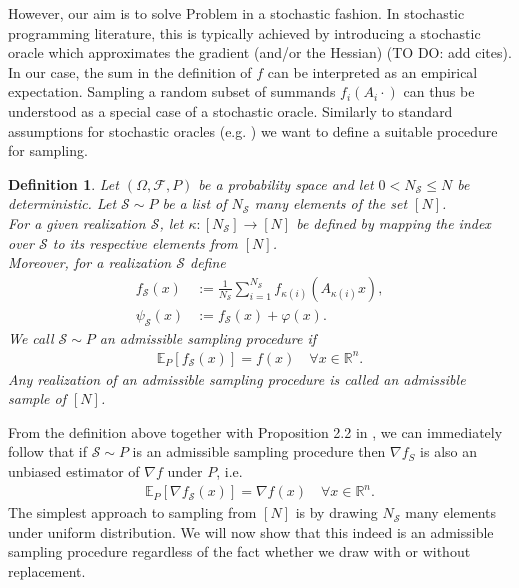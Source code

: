 \documentclass[12pt,a4paper,twoside]{article}
\makeatletter
\renewcommand*{\eqref}[1]{%
	\hyperref[{#1}]{\textup{\tagform@{\ref*{#1}}}}%
}
\theoremstyle{plain}
\newtheorem{rem}[thm]{Remark}
\newtheorem{defn}[thm]{Definition}
\theoremstyle{note}
\numberwithin{thm}{section}
\newcommand{\oneover}[1]{\frac{1}{#1}}
\newcommand{\ixmap}[1]{{\kappa(#1)}}
\let\temp\phi
\let\phi\varphi
\let\varphi\temp
\makeatother
\begin{document}
	However, our aim is to solve Problem \eqref{prob:deterministic} in a stochastic fashion. In stochastic programming literature, this is typically achieved by introducing a stochastic oracle which approximates the gradient (and/or the Hessian) (TO DO: add cites). In our case, the sum in the definition of $f$ can be interpreted as an empirical expectation. Sampling a random subset of summands $f_i(A_i \cdot)$ can thus be understood as a special case of a stochastic oracle. Similarly to standard assumptions for stochastic oracles (e.g. \cite{Ghadimi2013}) we want to define a suitable procedure for sampling. 
	\vspace{5mm}
	\begin{defn}
		\label{def:admissible_sampling}
		Let $(\Omega, \mathcal{F}, P)$ be a probability space and let $0<N_\mathcal{S}\leq N$ be deterministic. Let $\mathcal{S} \sim P$ be a list of $N_\mathcal{S}$ many elements of the set $[N]$.\\
		For a given realization $\mathcal{S}$, let $\kappa:[N_\mathcal{S}] \to [N]$ be defined by mapping the index over $\mathcal{S}$ to its respective elements from $[N]$.\\
		Moreover, for a realization $\mathcal{S}$ define 
		\begin{align*}
		f_{\mathcal{S}}(x) &:= \oneover{N_\mathcal{S}}\sum_{i=1}^{N_\mathcal{S}} f_\ixmap{i}(A_\ixmap{i} x),\\
		\psi_\mathcal{S}(x) &:= f_\mathcal{S}(x) + \phi(x).
		\end{align*}
		We call $\mathcal{S} \sim P$ an admissible sampling procedure if 
		\begin{align*}
			\mathbb{E}_P [f_\mathcal{S}(x)] = f(x) \quad \forall x \in \mathbb{R}^n.
		\end{align*}
		Any realization of an admissible sampling procedure is called an admissible sample of $[N]$.
	\end{defn}
	\medskip

	From the definition above together with Proposition 2.2 in \cite{Bertsekas1973}, we can immediately follow that if $\mathcal{S} \sim P$ is an admissible sampling procedure then $\nabla f_S$ is also an unbiased estimator of $\nabla f$ under $P$, i.e.
	\begin{align*}
		\mathbb{E}_P [\nabla f_\mathcal{S}(x)] = \nabla f(x) \quad \forall x \in \mathbb{R}^n.
	\end{align*}
	The simplest approach to sampling from $[N]$ is by drawing $N_\mathcal{S}$ many elements under uniform distribution. We will now show that this indeed is an admissible sampling procedure regardless of the fact whether we draw with or without replacement.\\
	\vspace{5mm}
	
\end{document}
